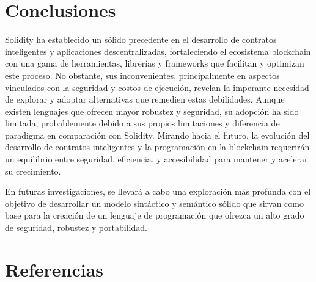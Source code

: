 \documentclass[a4paper,10pt]{article}
\begin{document}
	\section{Conclusiones}
	Solidity ha establecido un sólido precedente en el desarrollo de contratos inteligentes y aplicaciones descentralizadas, fortaleciendo el ecosistema blockchain con una gama de herramientas, librerías y frameworks que facilitan y optimizan este proceso. No obstante, sus inconvenientes, principalmente en aspectos vinculados con la seguridad y costos de ejecución, revelan la imperante necesidad de explorar y adoptar alternativas que remedien estas debilidades. Aunque existen lenguajes que ofrecen mayor robustez y seguridad, su adopción ha sido limitada, probablemente debido a sus propios limitaciones y diferencia de paradigma en comparación con Solidity. Mirando hacia el futuro, la evolución del desarrollo de contratos inteligentes y la programación en la blockchain requerirán un equilibrio entre seguridad, eficiencia, y accesibilidad para mantener y acelerar su crecimiento.
	
	En futuras investigaciones, se llevará a cabo una exploración más profunda con el objetivo de desarrollar un modelo sintáctico y semántico sólido que sirvan como base para la creación de un lenguaje de programación que ofrezca un alto grado de seguridad, robustez y portabilidad.
	\section{Referencias}
	\nocite{*}
	\printbibliography[heading=none]
\end{document}
